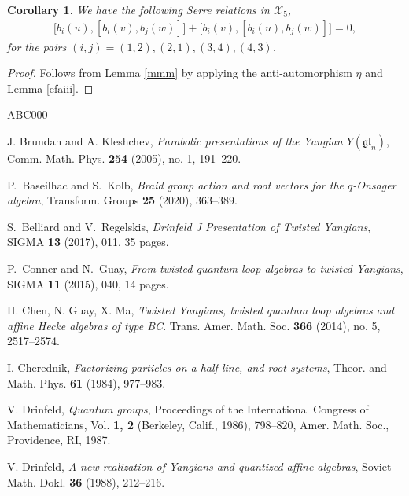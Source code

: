 \documentclass[11pt,reqno]{amsart}
\numberwithin{equation}{section}
\newtheorem{cor}[thm]{Corollary}
\theoremstyle{definition}
\theoremstyle{remark}
\newcommand{\scrX}{{\mathscr{X}}}
\begin{document}
\begin{cor}
We have the following Serre relations in $\scrX_5$,
\begin{align*}
\big[b_i(u),[b_i(v),b_j(w)]\big]+\big[b_i(v),[b_i(u),b_j(w)]\big]=0,
\end{align*}
for the pairs $(i,j)=(1,2),(2,1), (3,4),(4,3)$.
\end{cor}
\begin{proof}
Follows from Lemma \ref{mmm} by applying the anti-automorphism $\eta$ and Lemma \ref{efaiii}.
\end{proof}


\begin{thebibliography}{ABC000}

J. Brundan and A. Kleshchev, \textit{Parabolic presentations of the Yangian $Y(\mathfrak{gl}_n)$}, Comm. Math. Phys. \textbf{254}  (2005), no. 1, 191–220.

 P.~Baseilhac and S.~Kolb,
{\em Braid group action and root vectors for the $q$-Onsager algebra}, Transform. Groups {\bf 25} (2020),  363--389.

 S.~Belliard and V.~Regelskis,
{\em Drinfeld J Presentation of Twisted Yangians}, SIGMA {\bf 13} (2017), 011, 35 pages. 

 P.~Conner and N.~Guay,
{\em From twisted quantum loop algebras to twisted Yangians}, SIGMA {\bf 11} (2015), 040, 14 pages.

H. Chen, N. Guay, X. Ma,
\textit{Twisted Yangians, twisted quantum loop algebras and affine Hecke algebras of type BC}. Trans. Amer. Math. Soc. \textbf{366} (2014), no. 5, 2517–2574.

 I. Cherednik, 
{\em Factorizing particles on a half line, and root systems}, Theor. and Math. Phys. {\bf 61} (1984),
977--983.

 V. Drinfeld,
{\em Quantum groups}, Proceedings of the International Congress of Mathematicians, Vol. {\bf 1, 2} (Berkeley, Calif., 1986), 798--820, Amer. Math. Soc., Providence, RI, 1987.

V. Drinfeld, {\em A new realization of Yangians and quantized affine algebras}, Soviet Math. Dokl. \textbf{36} (1988), 212--216.


\end{thebibliography}
\end{document}
